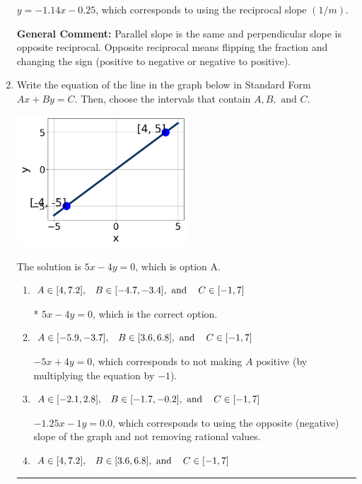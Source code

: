 \documentclass{extbook}[14pt]
\newcommand{\litem}[1]{\item #1

\rule{\textwidth}{0.4pt}}
\begin{document}
\begin{enumerate}
{\begin{enumerate}[label=\Alph*.]
 $y = -1.14x - 0.25$, which corresponds to using the reciprocal slope $(1/m)$.
\end{enumerate}

\textbf{General Comment:} Parallel slope is the same and perpendicular slope is opposite reciprocal. Opposite reciprocal means flipping the fraction and changing the sign (positive to negative or negative to positive).
}
\litem{
Write the equation of the line in the graph below in Standard Form $Ax+By=C$. Then, choose the intervals that contain $A, B, \text{ and } C$.

\begin{center}
    \includegraphics[width=0.5\textwidth]{../Figures/linearGraphToStandardB.png}
\end{center}


The solution is \( 5x - 4y = 0 \), which is option A.\begin{enumerate}[label=\Alph*.]
\item \( A \in [4, 7.2], \hspace{3mm} B \in [-4.7, -3.4], \text{ and } \hspace{3mm} C \in [-1, 7] \)

* $5x - 4y = 0$, which is the correct option.
\item \( A \in [-5.9, -3.7], \hspace{3mm} B \in [3.6, 6.8], \text{ and } \hspace{3mm} C \in [-1, 7] \)

 $-5x + 4y = 0$, which corresponds to not making $A$ positive (by multiplying the equation by $-1$).
\item \( A \in [-2.1, 2.8], \hspace{3mm} B \in [-1.7, -0.2], \text{ and } \hspace{3mm} C \in [-1, 7] \)

 $-1.25x - 1y = 0.0$, which corresponds to using the opposite (negative) slope of the graph and not removing rational values.
\item \( A \in [4, 7.2], \hspace{3mm} B \in [3.6, 6.8], \text{ and } \hspace{3mm} C \in [-1, 7] \)


\end{enumerate}}
\end{enumerate}
\end{document}
